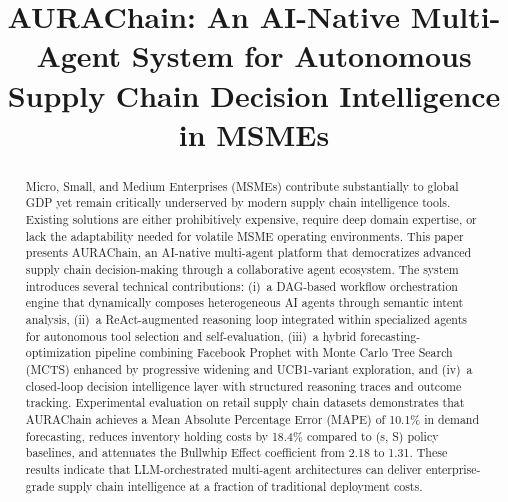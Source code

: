 \documentclass[conference]{IEEEtran}
\begin{document}
\title{AURAChain: An AI-Native Multi-Agent System for Autonomous Supply Chain Decision Intelligence in MSMEs}

\author{
}

\maketitle

\begin{abstract}
Micro, Small, and Medium Enterprises (MSMEs) contribute substantially to global GDP yet remain critically underserved by modern supply chain intelligence tools. Existing solutions are either prohibitively expensive, require deep domain expertise, or lack the adaptability needed for volatile MSME operating environments. This paper presents AURAChain, an AI-native multi-agent platform that democratizes advanced supply chain decision-making through a collaborative agent ecosystem. The system introduces several technical contributions: (i)~a DAG-based workflow orchestration engine that dynamically composes heterogeneous AI agents through semantic intent analysis, (ii)~a ReAct-augmented reasoning loop integrated within specialized agents for autonomous tool selection and self-evaluation, (iii)~a hybrid forecasting-optimization pipeline combining Facebook Prophet with Monte Carlo Tree Search (MCTS) enhanced by progressive widening and UCB1-variant exploration, and (iv)~a closed-loop decision intelligence layer with structured reasoning traces and outcome tracking. Experimental evaluation on retail supply chain datasets demonstrates that AURAChain achieves a Mean Absolute Percentage Error (MAPE) of 10.1\% in demand forecasting, reduces inventory holding costs by 18.4\% compared to (s, S) policy baselines, and attenuates the Bullwhip Effect coefficient from 2.18 to 1.31. These results indicate that LLM-orchestrated multi-agent architectures can deliver enterprise-grade supply chain intelligence at a fraction of traditional deployment costs.
\end{abstract}
\end{document}
